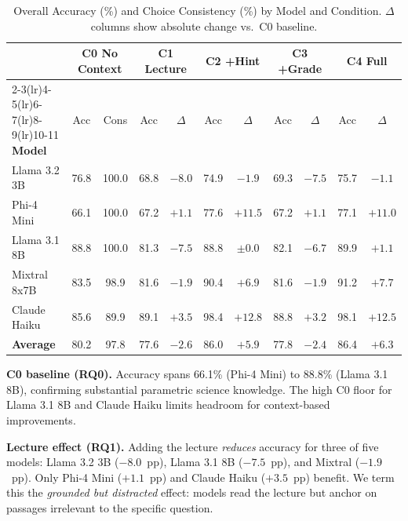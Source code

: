 \documentclass[journal]{IEEEtran}
\begin{document}
\begin{table}[t]
\centering
\caption{Overall Accuracy (\%) and Choice Consistency (\%) by Model and Condition.
         $\Delta$ columns show absolute change vs.\ C0 baseline.}
\label{tab:main}
\renewcommand{\arraystretch}{1.35}
\begin{tabular}{lcccccccccc}
\toprule
& \multicolumn{2}{c}{\textbf{C0 No Context}}
& \multicolumn{2}{c}{\textbf{C1 Lecture}}
& \multicolumn{2}{c}{\textbf{C2 +Hint}}
& \multicolumn{2}{c}{\textbf{C3 +Grade}}
& \multicolumn{2}{c}{\textbf{C4 Full}} \\
\cmidrule(lr){2-3}\cmidrule(lr){4-5}\cmidrule(lr){6-7}\cmidrule(lr){8-9}\cmidrule(lr){10-11}
\textbf{Model} & Acc & Cons & Acc & $\Delta$ & Acc & $\Delta$ & Acc & $\Delta$ & Acc & $\Delta$ \\
\midrule
\rowcolor{lightpurple}
Llama 3.2 3B  & 76.8 & 100.0 & 68.8 & $-8.0$   & 74.9 & $-1.9$   & 69.3 & $-7.5$ & 75.7 & $-1.1$  \\
Phi-4 Mini    & 66.1 & 100.0 & 67.2 & $+1.1$   & 77.6 & $+11.5$  & 67.2 & $+1.1$ & 77.1 & $+11.0$ \\
\rowcolor{lightpurple}
Llama 3.1 8B  & 88.8 & 100.0 & 81.3 & $-7.5$   & 88.8 & $\pm0.0$ & 82.1 & $-6.7$ & 89.9 & $+1.1$  \\
Mixtral 8x7B  & 83.5 &  98.9 & 81.6 & $-1.9$   & 90.4 & $+6.9$   & 81.6 & $-1.9$ & 91.2 & $+7.7$  \\
\rowcolor{lightpurple}
Claude Haiku  & 85.6 &  89.9 & 89.1 & $+3.5$   & 98.4 & $+12.8$  & 88.8 & $+3.2$ & 98.1 & $+12.5$ \\
\midrule
\textbf{Average} & 80.2 & 97.8 & 77.6 & $-2.6$ & 86.0 & $+5.9$  & 77.8 & $-2.4$ & 86.4 & $+6.3$  \\
\bottomrule
\end{tabular}
\end{table}

\textbf{C0 baseline (RQ0).} Accuracy spans 66.1\% (Phi-4 Mini) to 88.8\%
(Llama 3.1 8B), confirming substantial parametric science knowledge. The
high C0 floor for Llama 3.1 8B and Claude Haiku limits headroom for
context-based improvements.

\textbf{Lecture effect (RQ1).} Adding the lecture \emph{reduces} accuracy for
three of five models: Llama 3.2 3B ($-8.0$~pp), Llama 3.1 8B ($-7.5$~pp),
and Mixtral ($-1.9$~pp). Only Phi-4 Mini ($+1.1$~pp) and Claude Haiku
($+3.5$~pp) benefit. We term this the \emph{grounded but distracted} effect:
models read the lecture but anchor on passages irrelevant to the specific question.
\end{document}
